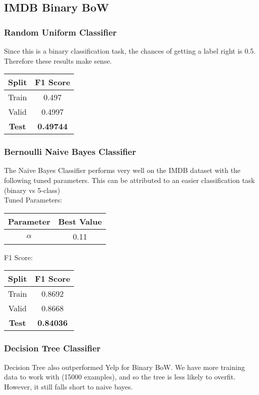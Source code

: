 \documentclass{article}
\begin{document}
\subsection{IMDB Binary BoW}
\subsubsection{Random Uniform Classifier}
Since this is a binary classification task, the chances of getting a label right is 0.5. Therefore these results make sense.
\begin{center}
\begin{tabular}{ |c|c| } 
	\hline
	\textbf{Split} & \textbf{F1 Score} \\ 
	\hline
	Train & 0.497 \\
	Valid & 0.4997 \\ 
	\textbf{Test} & \textbf{0.49744} \\
	\hline
\end{tabular}
\end{center}

\subsubsection{Bernoulli Naive Bayes Classifier}
The Naive Bayes Classifier performs very well on the IMDB dataset with the following tuned parameters. This can be attributed to an easier classification task (binary vs 5-class) \\

Tuned Parameters:
\begin{center}
\begin{tabular}{ |c|c| } 
	\hline
	\textbf{Parameter} & \textbf{Best Value} \\ 
	\hline
	\(\alpha\) & 0.11 \\ 
	\hline
\end{tabular}
\end{center}

F1 Score:
\begin{center}
\begin{tabular}{ |c|c| } 
	\hline
	\textbf{Split} & \textbf{F1 Score} \\ 
	\hline
	Train & 0.8692 \\
	Valid & 0.8668 \\ 
	\textbf{Test} & \textbf{0.84036} \\
	\hline
\end{tabular}
\end{center}

\subsubsection{Decision Tree Classifier}
Decision Tree also outperformed Yelp for Binary BoW. We have more training data to work with (15000 examples), and so the tree is less likely to overfit. However, it still falls short to naive bayes. \\
\end{document}
